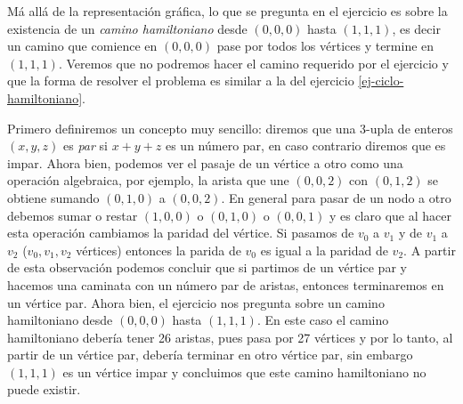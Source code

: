 \documentclass[12pt,spanish,makeidx]{amsbook}
\theoremstyle{definition}
\theoremstyle{remark}
\begin{document}
\begin{enumerate}
\begin{center}
	 	
	 \end{center}
	 Má allá de la representación gráfica, lo que se pregunta en el ejercicio es sobre la existencia de un \textit{camino hamiltoniano} desde $(0,0,0)$ hasta $(1,1,1)$, es decir un camino  que comience en $(0,0,0)$ pase por todos los vértices y  termine en $(1,1,1)$. Veremos que no podremos hacer el camino requerido por el ejercicio y que la forma de resolver el problema es similar a la del ejercicio \ref{ej-ciclo-hamiltoniano}.    
	 
	 Primero definiremos un concepto muy sencillo: diremos  que una 3-upla de enteros $(x,y,z)$ es  \textit{par} si $x+y+z$ es un número par, en caso contrario diremos que es impar. 
	 Ahora bien, podemos ver el pasaje de un vértice a otro como una operación algebraica, por ejemplo, la arista que une $(0,0,2)$ con $(0,1,2)$ se obtiene sumando $(0,1,0)$ a $(0,0,2)$.  En general  para pasar de un nodo a otro debemos sumar o restar  $(1,0,0)$ o $(0,1,0)$ o $(0,0,1)$ y es claro que al hacer esta operación cambiamos la paridad del vértice. Si pasamos de $v_0$ a $v_1$ y de $v_1$ a $v_2$ ($v_0,v_1,v_2$ vértices) entonces la parida de $v_0$ es igual a la paridad de $v_2$.  A partir de esta observación podemos concluir que si partimos de un vértice par y hacemos una caminata con un número par de aristas,  entonces terminaremos en un vértice par. Ahora bien, el  ejercicio nos pregunta sobre un camino hamiltoniano desde $(0,0,0)$ hasta $(1,1,1)$. En este caso el camino hamiltoniano debería tener 26 aristas, pues pasa por 27 vértices y por lo tanto,  al partir de un vértice par,  debería terminar  en otro vértice par, sin embargo $(1,1,1)$ es un vértice impar y concluimos que  este camino hamiltoniano  no  puede existir.  
 

\end{enumerate}
\end{document}
